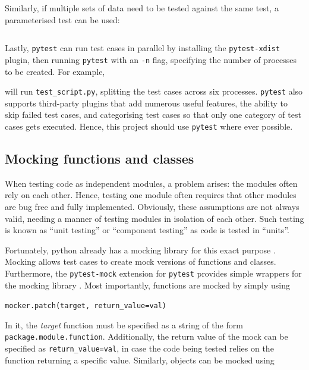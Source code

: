 \documentclass[11pt]{article}
\begin{document}
\inputminted{python}{python_examples/pytest_fixture.py}

\noindent
Similarly, if multiple sets of data need to be tested against the same test, a parameterised test can be used:

\inputminted{python}{python_examples/pytest_parameterize.py}

\noindent
Lastly, \texttt{pytest} can run test cases in parallel by installing the \texttt{pytest-xdist} plugin, then running \texttt{pytest} with an \texttt{-n} flag, specifying the number of processes to be created. For example,


\noindent
will run \texttt{test\_script.py}, splitting the test cases across six processes. \texttt{pytest} also supports third-party plugins that add numerous useful features, the ability to skip failed test cases, and categorising test cases so that only one category of test cases gets executed. Hence, this project should use \texttt{pytest} where ever possible.

\subsection{Mocking functions and classes}

When testing code as independent modules, a problem arises: the modules often rely on each other. Hence, testing one module often requires that other modules are bug free and fully implemented. Obviously, these assumptions are not always valid, needing a manner of testing modules in isolation of each other. Such testing is known as ``unit testing'' or ``component testing'' as code is tested in ``units''.

Fortunately, \Gls{python} already has a mocking \gls{library} for this exact purpose \cite{python-mock}. Mocking allows test cases to create mock versions of functions and classes. Furthermore, the \texttt{pytest-mock} extension for \texttt{pytest} provides simple wrappers for the mocking \gls{library} \cite{pytest-mock}. Most importantly, functions are mocked by simply using

\vspace{\baselineskip}
\texttt{mocker.patch(target, return_value=val)}

\vspace{\baselineskip}

\noindent
In it, the \textit{target} function must be specified as a string of the form \texttt{package.module.function}. Additionally, the return value of the mock can be specified as \texttt{return_value=val}, in case the code being tested relies on the function returning a specific value. Similarly, \glspl{object} can be mocked using
\end{document}
